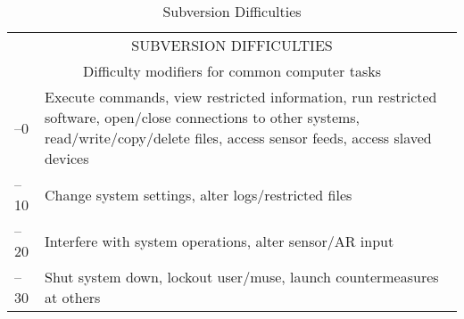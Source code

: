 \begin{table}
\caption{Subversion Difficulties}
\begin{tabularx}{\textwidth}{|l|X|}
\hline
\multicolumn{2}{|c|}{SUBVERSION DIFFICULTIES} \\
\multicolumn{2}{|c|}{Difficulty modifiers for common computer tasks} \\
\hline
\hline
–0 & Execute commands, view restricted information, run restricted software, open/close connections to other systems, read/write/copy/delete files, access sensor feeds, access slaved devices  \\
\hline
–10 & Change system settings, alter logs/restricted files  \\
\hline
–20 & Interfere with system operations, alter sensor/AR input  \\
\hline
–30 & Shut system down, lockout user/muse, launch countermeasures at others \\
\hline
\end{tabularx}
\end{table}


